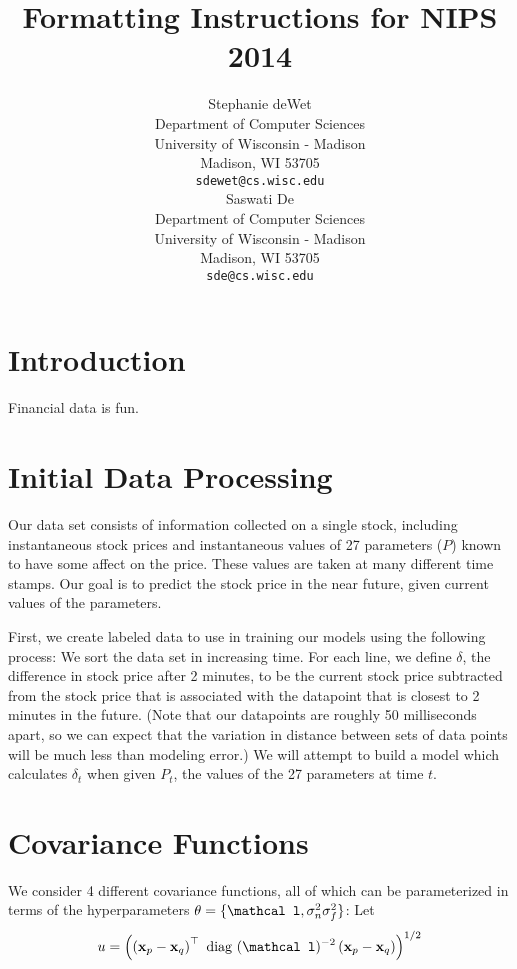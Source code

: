 \documentclass{article} %
\title{Formatting Instructions for NIPS 2014}
\author{
Stephanie deWet \\
Department of Computer Sciences\\
University of Wisconsin - Madison \\
Madison, WI 53705 \\
\texttt{sdewet@cs.wisc.edu} \\
\And
Saswati De \\
Department of Computer Sciences\\
University of Wisconsin - Madison \\
Madison, WI 53705 \\
\texttt{sde@cs.wisc.edu} \\
}
\def\bfx{\mathbf x}
\def\bftheta{\mathbf \theta}
\def\bfl{\mathbf \mathcal l}
\def\diag{\mbox{ diag }}
\begin{document}
\maketitle

\begin{abstract}
\end{abstract}

\section{Introduction}
Financial data is fun.

\section{Initial Data Processing}
Our data set consists of information collected on a single stock, including instantaneous stock prices and instantaneous values of 27 parameters ($P$) known to have some affect on the price.
These values are taken at many different time stamps.
Our goal is to predict the stock price in the near future, given current values of the parameters.

First, we create labeled data to use in training our models using the following process:
We sort the data set in increasing time.
For each line, we define $\delta$, the difference in stock price after 2 minutes, to be the current stock price subtracted from the stock price that is associated with the datapoint that is closest to 2 minutes in the future.
(Note that our datapoints are roughly 50 milliseconds apart, so we can expect that the variation in distance between sets of data points will be much less than modeling error.)
We will attempt to build a model which calculates $\delta_t$ when given $P_t$, the values of the 27 parameters at time $t$.



\section{Covariance Functions}
We consider 4 different covariance functions, all of which can be parameterized in terms of the hyperparameters $\bftheta = \{\bfl, \sigma_n^2 \sigma_f^2\}$:
Let
\begin{equation}
	u = \left( \left( \bfx_p - \bfx_q \right)^\top \diag(\bfl)^{-2} \left( \bfx_p - \bfx_q \right) \right)^{1/2}
\end{equation}
\end{document}
